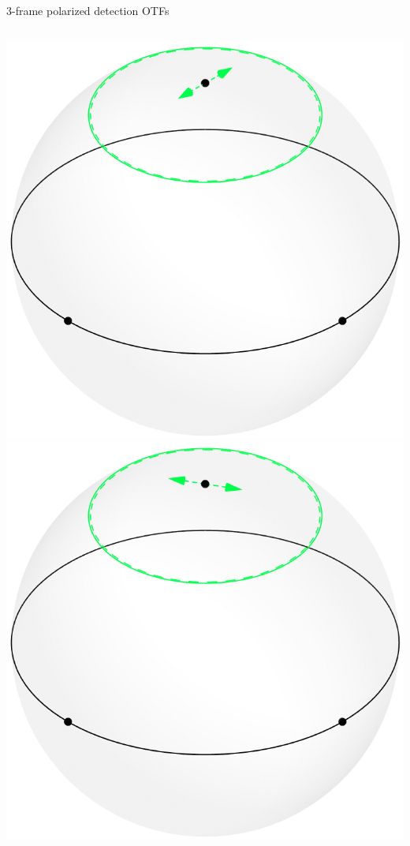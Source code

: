 \documentclass[presentation]{beamer}
\begin{document}
\begin{frame}[label=sec-1]{3-frame polarized detection OTFs}
  \begin{columns}
    \begin{column}{0.25\textwidth}
      \centering      
      \includegraphics[width=1.0\columnwidth]{pol_detect3/scene0.pdf}\\
      \includegraphics[width=1.0\columnwidth]{pol_detect3/scene1.pdf}

\end{column}
\end{columns}
\end{frame}
\end{document}

